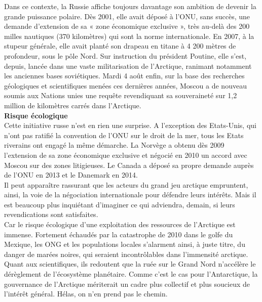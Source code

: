 \documentclass[8pt]{article}
\begin{document}
Dans ce contexte, la Russie affiche toujours davantage son ambition de devenir la grande puissance polaire. Dès 2001, elle avait déposé à l’ONU, sans succès, une demande d’extension de sa « zone économique exclusive », très au-delà des 200 milles nautiques (370 kilomètres) qui sont la norme internationale. En 2007, à la stupeur générale, elle avait planté son drapeau en titane à 4 200 mètres de profondeur, sous le pôle Nord. Sur instruction du président Poutine, elle s’est, depuis, lancée dans une vaste militarisation de l’Arctique, ranimant notamment les anciennes bases soviétiques. Mardi 4 août enfin, sur la base des recherches géologiques et scientifiques menées ces dernières années, Moscou a de nouveau soumis aux Nations unies une requête revendiquant sa souveraineté sur 1,2 million de kilomètres carrés dans l’Arctique.\\

\textbf{Risque écologique}\\

Cette initiative russe n’est en rien une surprise. A l’exception des Etats-Unis, qui n’ont pas ratifié la convention de l’ONU sur le droit de la mer, tous les Etats riverains ont engagé la même démarche. La Norvège a obtenu dès 2009 l’extension de sa zone économique exclusive et négocié en 2010 un accord avec Moscou sur des zones litigieuses. Le Canada a déposé sa propre demande auprès de l’ONU en 2013 et le Danemark en 2014.\\


Il peut apparaître rassurant que les acteurs du grand jeu arctique empruntent, ainsi, la voie de la négociation internationale pour défendre leurs intérêts. Mais il est beaucoup plus inquiétant d’imaginer ce qui adviendra, demain, si leurs revendications sont satisfaites.\\

Car le risque écologique d’une exploitation des ressources de l’Arctique est immense. Fortement échaudés par la catastrophe de 2010 dans le golfe du Mexique, les ONG et les populations locales s’alarment ainsi, à juste titre, du danger de marées noires, qui seraient incontrôlables dans l’immensité arctique. Quant aux scientifiques, ils redoutent que la ruée sur le Grand Nord n’accélère le dérèglement de l’écosystème planétaire. Comme c’est le cas pour l’Antarctique, la gouvernance de l’Arctique mériterait un cadre plus collectif et plus soucieux de l’intérêt général. Hélas, on n’en prend pas le chemin.

\newpage
\end{document}

